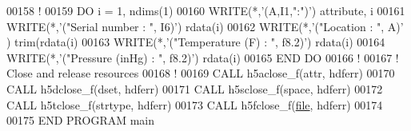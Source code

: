 \begin{DoxyCode}
00158   \textcolor{comment}{!}
00159   \textcolor{keywordflow}{DO} i = 1, ndims(1)
00160      \textcolor{keyword}{WRITE}(*,\textcolor{stringliteral}{'(A,I1,":")'}) attribute, i
00161      \textcolor{keyword}{WRITE}(*,\textcolor{stringliteral}{'("Serial number   : ", I6)'}) rdata(i)%
00162      \textcolor{keyword}{WRITE}(*,\textcolor{stringliteral}{'("Location        : ", A)'} ) trim(rdata(i)%
00163      \textcolor{keyword}{WRITE}(*,\textcolor{stringliteral}{'("Temperature (F) : ", f8.2)'}) rdata(i)%
00164      \textcolor{keyword}{WRITE}(*,\textcolor{stringliteral}{'("Pressure (inHg) : ", f8.2)'}) rdata(i)%
00165 \textcolor{keywordflow}{  END DO}
00166   \textcolor{comment}{!}
00167   \textcolor{comment}{! Close and release resources}
00168   \textcolor{comment}{!}
00169   \textcolor{keyword}{CALL }h5aclose\_f(attr, hdferr)
00170   \textcolor{keyword}{CALL }h5dclose\_f(dset, hdferr)
00171   \textcolor{keyword}{CALL }h5sclose\_f(space, hdferr)
00172   \textcolor{keyword}{CALL }h5tclose\_f(strtype, hdferr)
00173   \textcolor{keyword}{CALL }h5fclose\_f(\hyperlink{structfile}{file}, hdferr)
00174 
00175 \textcolor{keyword}{END PROGRAM }main
\end{DoxyCode}

